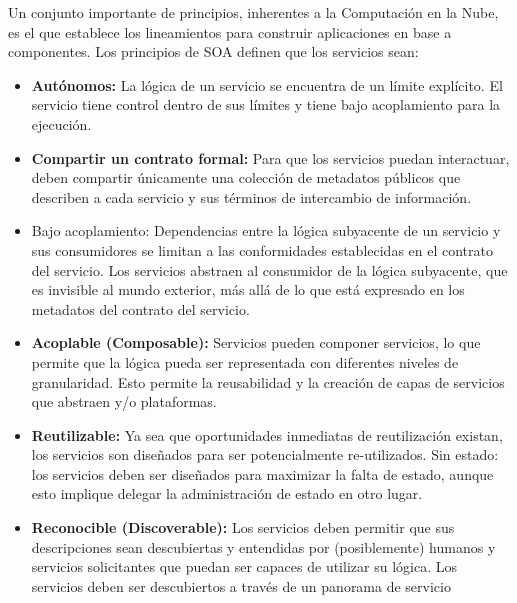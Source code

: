         Un conjunto importante de principios, inherentes a la Computación en la Nube, es el que establece los lineamientos para construir aplicaciones en base a componentes. Los principios de SOA definen que los servicios sean:
        \begin{itemize}
            \item \textbf{Autónomos: }La lógica de un servicio se encuentra de un límite explícito. El servicio tiene control dentro de sus límites y tiene bajo acoplamiento para la ejecución. 
            \item \textbf{Compartir un contrato formal: }Para que los servicios puedan interactuar, deben compartir únicamente una colección de metadatos públicos que describen a cada servicio y sus términos de intercambio de información.
            \item Bajo acoplamiento: Dependencias entre la lógica subyacente de un servicio y sus consumidores se limitan a las conformidades establecidas en el contrato del servicio. Los servicios abstraen al consumidor de la lógica subyacente, que es invisible al mundo exterior, más allá de lo que está expresado en los metadatos del contrato del servicio.
            \item \textbf{Acoplable (Composable):} Servicios pueden componer servicios, lo que permite que la lógica pueda ser representada con diferentes niveles de granularidad. Esto permite la reusabilidad y la creación de capas de servicios que abstraen y/o plataformas.
            \item \textbf{Reutilizable: }Ya sea que oportunidades inmediatas de reutilización existan, los servicios son diseñados para ser potencialmente re-utilizados.
            Sin estado: los servicios deben ser diseñados para maximizar la falta de estado, aunque esto implique delegar la administración de estado en otro lugar.
            \item \textbf{Reconocible (Discoverable): }Los servicios deben permitir que sus descripciones sean descubiertas y entendidas por (posiblemente) humanos y servicios solicitantes que puedan ser capaces de utilizar su lógica. Los servicios deben ser descubiertos a través de un panorama de servicio
        \end{itemize}
        
